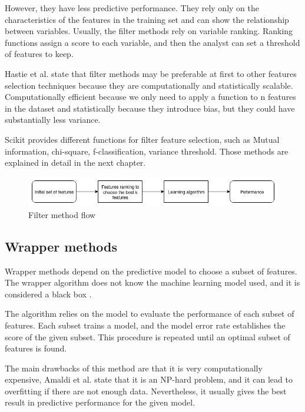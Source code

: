 However, they have less predictive performance.  They rely only on the characteristics of the features in the training set and can show the relationship between variables. \cite{sanchez2007filter}
Usually, the filter methods rely on variable ranking. Ranking functions assign a score to each variable, and then the analyst can set a threshold of features to keep. 

Hastie et al. \cite{hastie2009elements} state that filter methods may be preferable at first to other features selection techniques because they are computationally and statistically scalable.  Computationally efficient because we only need to apply a function to n features in the dataset and statistically because they introduce bias, but they could have substantially less variance.

Scikit provides different functions for filter feature selection, such as Mutual information, chi-square, f-classification, variance threshold. Those methods are explained in detail in the next chapter.

\begin{figure}[!h]
	\centering
	\includegraphics[width=1.0\columnwidth]{filter}
	\caption{Filter method flow}
	\label{fig:filter}
\end{figure}


\subsection{Wrapper methods}

Wrapper methods depend on the predictive model to choose a subset of features. The wrapper algorithm does not know the machine learning model used, and it is considered a black box \cite{kohavi1997wrappers}. 

The algorithm relies on the model to evaluate the performance of each subset of features. Each subset trains a model, and the model error rate establishes the score of the given subset. This procedure is repeated until an optimal subset of features is found. 

The main drawbacks of this method are that it is very computationally expensive, Amaldi et al. \cite{amaldi1998approximability} state that it is an NP-hard problem, and it can lead to overfitting if there are not enough data. Nevertheless, it usually gives the best result in predictive performance for the given model. \\

